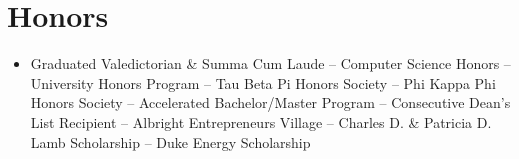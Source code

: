 \documentclass[letterpaper,11pt]{article}
\newcommand{\resumeSubHeadingListStart}{\begin{itemize}[leftmargin=*]}
\newcommand{\resumeSubHeadingListEnd}{\end{itemize}}
\begin{document}
\section{Honors}
\resumeSubHeadingListStart
\item\small{Graduated Valedictorian \& Summa Cum Laude -- Computer Science Honors -- University Honors Program -- Tau Beta Pi Honors Society -- Phi Kappa Phi Honors Society -- Accelerated Bachelor/Master Program -- Consecutive Dean’s List Recipient -- Albright Entrepreneurs Village -- Charles D. \& Patricia D. Lamb Scholarship -- Duke Energy Scholarship
  \vspace{-2pt}
}
\resumeSubHeadingListEnd

\end{document}

